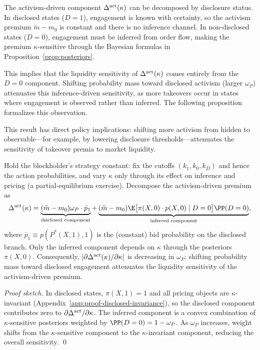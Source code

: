 The activism-driven component $\Delta^{\textup{act}}(\kappa)$ can be decomposed by disclosure status. In disclosed states ($D=1$), engagement is known with certainty, so the activism premium $\tilde{m}-m_0$ is constant and there is no inference channel. In non-disclosed states ($D=0$), engagement must be inferred from order flow, making the premium $\kappa$-sensitive through the Bayesian formulas in Proposition~\ref{prop:posteriors}.

This implies that the liquidity sensitivity of $\Delta^{\textup{act}}(\kappa)$ comes entirely from the $D=0$ component. Shifting probability mass toward disclosed activism (larger $\omega_P$) attenuates this inference-driven sensitivity, as more takeovers occur in states where engagement is observed rather than inferred. The following proposition formalizes this observation.

This result has direct policy implications: shifting more activism from hidden to observable---for example, by lowering disclosure thresholds---attenuates the sensitivity of takeover premia to market liquidity.

\begin{proposition}
\label{prop:disclosure-attenuation}
Hold the blockholder's strategy constant: fix the cutoffs $(k_1,k_0,k_D)$ and hence the action probabilities, and vary $\kappa$ only through its effect on inference and pricing (a partial-equilibrium exercise). Decompose the activism-driven premium as
\[
\Delta^{\textup{act}}(\kappa) = \underbrace{(\tilde{m}-m_0)\omega_P \cdot \bar{p}_1}_{\text{disclosed component}} + \underbrace{(\tilde{m}-m_0)\E\big[\pi(X,0)\cdot p(X,0) \mid D=0\big]\PP(D=0)}_{\text{inferred component}},
\]
where $\bar{p}_1 \equiv p(P^*(X,1),1)$ is the (constant) bid probability on the disclosed branch. Only the inferred component depends on $\kappa$ through the posteriors $\pi(X,0)$. Consequently, $|\partial \Delta^{\textup{act}}(\kappa)/\partial\kappa|$ is decreasing in $\omega_P$: shifting probability mass toward disclosed engagement attenuates the liquidity sensitivity of the activism-driven premium.
\end{proposition}

\textit{Proof sketch.} In disclosed states, $\pi(X,1)=1$ and all pricing objects are $\kappa$-invariant (Appendix~\ref{app:proof-disclosed-invariance}), so the disclosed component contributes zero to $\partial\Delta^{\textup{act}}/\partial\kappa$. The inferred component is a convex combination of $\kappa$-sensitive posteriors weighted by $\PP(D=0)=1-\omega_P$. As $\omega_P$ increases, weight shifts from the $\kappa$-sensitive component to the $\kappa$-invariant component, reducing the overall sensitivity. \qed

